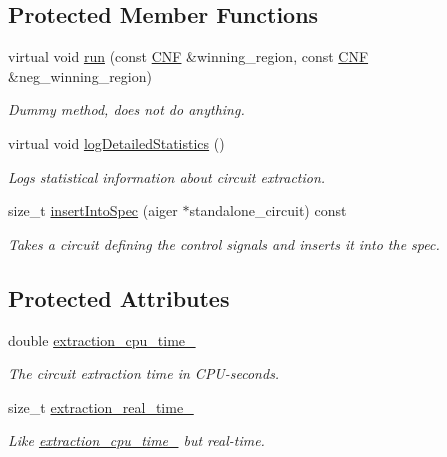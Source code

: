 \subsection*{Protected Member Functions}
\begin{DoxyCompactItemize}
\item 
virtual void \hyperlink{classStoreImplExtractor_a69c775e70973cbd4b6a69775f25367cd}{run} (const \hyperlink{classCNF}{C\-N\-F} \&winning\-\_\-region, const \hyperlink{classCNF}{C\-N\-F} \&neg\-\_\-winning\-\_\-region)
\begin{DoxyCompactList}\small\item\em Dummy method, does not do anything. \end{DoxyCompactList}\item 
virtual void \hyperlink{classCNFImplExtractor_abe790c767f6c71a52ef8b0a61ab39eaa}{log\-Detailed\-Statistics} ()
\begin{DoxyCompactList}\small\item\em Logs statistical information about circuit extraction. \end{DoxyCompactList}\item 
size\-\_\-t \hyperlink{classCNFImplExtractor_a0970602635f3356712d57ebb28d12c0d}{insert\-Into\-Spec} (aiger $\ast$standalone\-\_\-circuit) const 
\begin{DoxyCompactList}\small\item\em Takes a circuit defining the control signals and inserts it into the spec. \end{DoxyCompactList}\end{DoxyCompactItemize}
\subsection*{Protected Attributes}
\begin{DoxyCompactItemize}
\item 
double \hyperlink{classCNFImplExtractor_ab8be06d42fd3c4b569ec22cfcf2f508e}{extraction\-\_\-cpu\-\_\-time\-\_\-}
\begin{DoxyCompactList}\small\item\em The circuit extraction time in C\-P\-U-\/seconds. \end{DoxyCompactList}\item 
size\-\_\-t \hyperlink{classCNFImplExtractor_ae06413cf08f868357d64545b3041aa18}{extraction\-\_\-real\-\_\-time\-\_\-}
\begin{DoxyCompactList}\small\item\em Like \hyperlink{classCNFImplExtractor_ab8be06d42fd3c4b569ec22cfcf2f508e}{extraction\-\_\-cpu\-\_\-time\-\_\-} but real-\/time. \end{DoxyCompactList}\end{DoxyCompactItemize}
